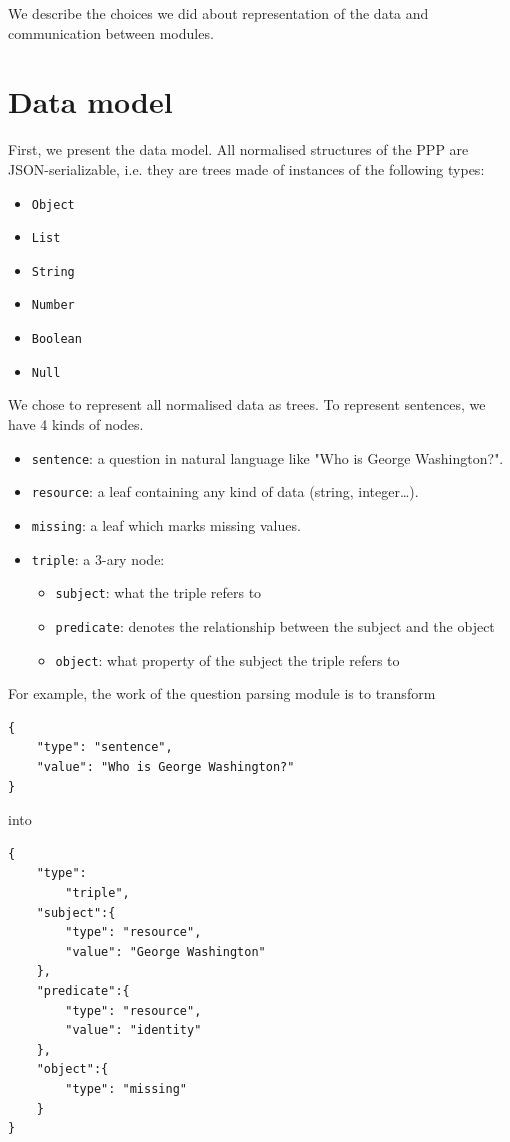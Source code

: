 We describe the choices we did about representation of the data and communication between modules.

\section{Data model}
\label{rdf}

First, we present the data model. All normalised structures of the PPP are JSON-serializable, i.e. they are trees made of instances of the following types:
\begin{itemize}
    \item \texttt{Object}
    \item \texttt{List}
    \item \texttt{String}
    \item \texttt{Number}
    \item \texttt{Boolean}
    \item \texttt{Null}
\end{itemize}

We chose to represent all normalised data as trees. To represent sentences, we have 4 kinds of nodes.

\begin{itemize}
    \item \texttt{sentence}: a question in natural language like "Who is George Washington?".
    \item \texttt{resource}: a leaf containing any kind of data (string, integer\ldots).
    \item \texttt{missing}: a leaf which marks missing values.
    \item \texttt{triple}: a 3-ary node:
        \begin{itemize}
            \item \texttt{subject}: what the triple refers to
            \item \texttt{predicate}: denotes the relationship between the subject and the
  object
            \item \texttt{object}: what property of the subject the triple refers to
        \end{itemize}         
\end{itemize}

For example, the work of the question parsing module is to transform 
\begin{verbatim}
{
    "type": "sentence", 
    "value": "Who is George Washington?"
}
\end{verbatim}
into 
\begin{verbatim}
{
    "type":
        "triple",
    "subject":{
        "type": "resource",
        "value": "George Washington"
    },
    "predicate":{
        "type": "resource",
        "value": "identity"
    },
    "object":{
        "type": "missing"
    }
}
\end{verbatim}

